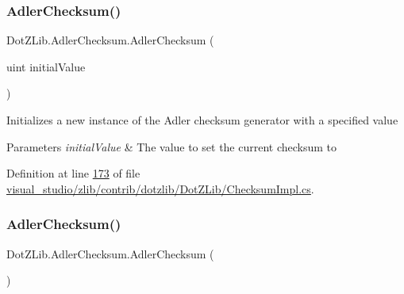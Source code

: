 \mbox{\label{class_dot_z_lib_1_1_adler_checksum_ab983bcafef50a5f578398d2aa83d7433}} 
\subsubsection{\texorpdfstring{Adler\+Checksum()}{AdlerChecksum()}\hspace{0.1cm}{\footnotesize\ttfamily [2/4]}}
{\footnotesize\ttfamily Dot\+Z\+Lib.\+Adler\+Checksum.\+Adler\+Checksum (\begin{DoxyParamCaption}\item[{uint}]{initial\+Value }\end{DoxyParamCaption})\hspace{0.3cm}{\ttfamily [inline]}}



Initializes a new instance of the Adler checksum generator with a specified value 


\begin{DoxyParams}{Parameters}
{\em initial\+Value} & The value to set the current checksum to\\
\hline
\end{DoxyParams}


Definition at line \hyperlink{visual__studio_2zlib_2contrib_2dotzlib_2_dot_z_lib_2_checksum_impl_8cs_source_l00173}{173} of file \hyperlink{visual__studio_2zlib_2contrib_2dotzlib_2_dot_z_lib_2_checksum_impl_8cs_source}{visual\+\_\+studio/zlib/contrib/dotzlib/\+Dot\+Z\+Lib/\+Checksum\+Impl.\+cs}.

\mbox{\label{class_dot_z_lib_1_1_adler_checksum_a8b968384065103a827ac7bfb7bfab66d}} 
\subsubsection{\texorpdfstring{Adler\+Checksum()}{AdlerChecksum()}\hspace{0.1cm}{\footnotesize\ttfamily [3/4]}}
{\footnotesize\ttfamily Dot\+Z\+Lib.\+Adler\+Checksum.\+Adler\+Checksum (\begin{DoxyParamCaption}{ }\end{DoxyParamCaption})\hspace{0.3cm}{\ttfamily [inline]}}



